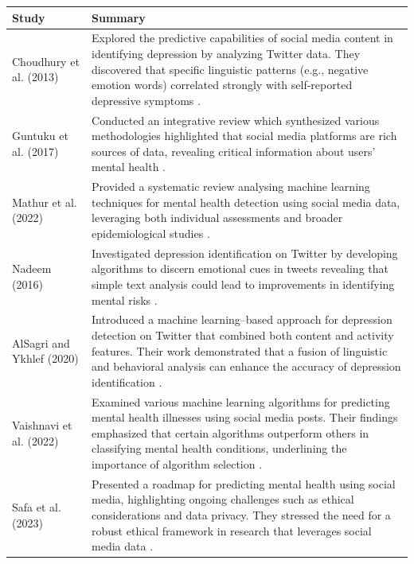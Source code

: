 \begin{table}[H]
    \centering
    \label{tab:related_studies}
    \begin{tabularx}{\textwidth}{|p{3.5cm}|X|}
    \hline
    \textbf{Study} & \textbf{Summary} \\ \hline
    Choudhury et al. (2013) & Explored the predictive capabilities of social media content in identifying depression by analyzing Twitter data. They discovered that specific linguistic patterns (e.g., negative emotion words) correlated strongly with self-reported depressive symptoms \cite{Choudhury2013PredictingDV}. \\ \hline
    Guntuku et al. (2017) & Conducted an integrative review which synthesized various methodologies highlighted that social media platforms are rich sources of data, revealing critical information about users' mental health \cite{Guntuku2017DetectingDA}. \\ \hline
    Mathur et al. (2022) & Provided a systematic review analysing machine learning techniques for mental health detection using social media data, leveraging both individual assessments and broader epidemiological studies \cite{Mathur2022MentalHC}. \\ \hline
    Nadeem (2016) & Investigated depression identification on Twitter by developing algorithms to discern emotional cues in tweets revealing that simple text analysis could lead to improvements in identifying mental risks \cite{nadeem2016identifying}. \\ \hline
    AlSagri and Ykhlef (2020) & Introduced a machine learning–based approach for depression detection on Twitter that combined both content and activity features. Their work demonstrated that a fusion of linguistic and behavioral analysis can enhance the accuracy of depression identification \cite{alsagri2020machine}. \\ \hline
    Vaishnavi et al. (2022) & Examined various machine learning algorithms for predicting mental health illnesses using social media posts. Their findings emphasized that certain algorithms outperform others in classifying mental health conditions, underlining the importance of algorithm selection \cite{Vaishnavi_2022}. \\ \hline
    Safa et al. (2023) & Presented a roadmap for predicting mental health using social media, highlighting ongoing challenges such as ethical considerations and data privacy. They stressed the need for a robust ethical framework in research that leverages social media data \cite{safa2023predictingmentalhealthusing}. \\ \hline

\end{tabularx}
\end{table}
